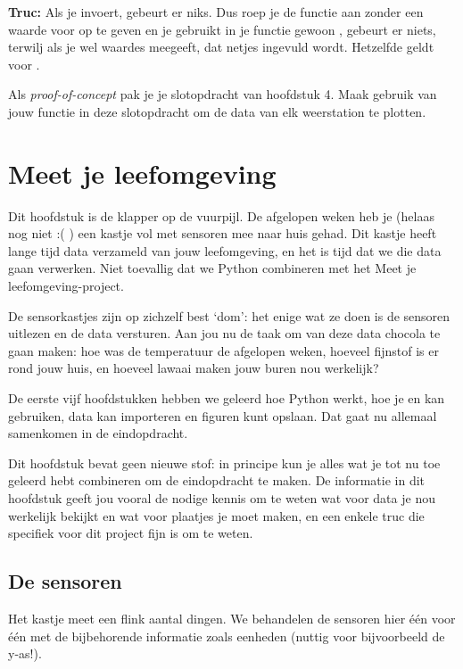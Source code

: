 \documentclass[a4paper,11pt, fleqn]{article}
\newcommand{\ditwc}{Naam van het huidige werkcollege}
\begin{document}
\bigbreak
{\bf Truc:} Als je  invoert, gebeurt er niks. Dus roep je de functie aan zonder een waarde voor  op te geven en je gebruikt in je functie gewoon , gebeurt er niets, terwilj als je wel waardes meegeeft, dat netjes ingevuld wordt. Hetzelfde geldt voor .

\bigbreak
Als {\it proof-of-concept} pak je je slotopdracht van hoofdstuk 4. Maak gebruik van jouw functie in deze slotopdracht om de data van elk weerstation te plotten.


\clearpage
\renewcommand{\ditwc}{Meet je leefomgeving}
\section[Meet je leefomgeving]{\ditwc}
Dit hoofdstuk is de klapper op de vuurpijl. De afgelopen weken heb je (helaas nog niet :( ) een kastje vol met sensoren mee naar huis gehad. Dit kastje heeft lange tijd data verzameld van jouw leefomgeving, en het is tijd dat we die data gaan verwerken. Niet toevallig dat we Python combineren met het Meet je leefomgeving-project. 

De sensorkastjes zijn op zichzelf best `dom': het enige wat ze doen is de sensoren uitlezen en de data versturen. Aan jou nu de taak om van deze data chocola te gaan maken: hoe was de temperatuur de afgelopen weken, hoeveel fijnstof is er rond jouw huis, en hoeveel lawaai maken jouw buren nou werkelijk?

De eerste vijf hoofdstukken hebben we geleerd hoe Python werkt, hoe je  en  kan gebruiken, data kan importeren en figuren kunt opslaan. Dat gaat nu allemaal samenkomen in de eindopdracht.

Dit hoofdstuk bevat geen nieuwe stof: in principe kun je alles wat je tot nu toe geleerd hebt combineren om de eindopdracht te maken. De informatie in dit hoofdstuk geeft jou vooral de nodige kennis om te weten wat voor data je nou werkelijk bekijkt en wat voor plaatjes je moet maken, en een enkele truc die specifiek voor dit project fijn is om te weten.

\subsection{De sensoren}
Het kastje meet een flink aantal dingen. We behandelen de sensoren hier \'e\'en voor \'e\'en met de bijbehorende informatie zoals eenheden (nuttig voor bijvoorbeeld de y-as!).
\end{document}
